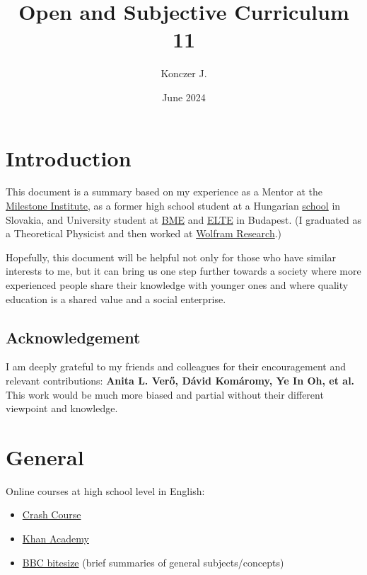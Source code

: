\documentclass{article}
\title{Open and Subjective Curriculum \\ 11}
\author{Konczer J.}
\date{June 2024}
\begin{document}
\maketitle

\section*{}

\section{Introduction}

This document is a summary based on my experience as a Mentor at the \href{https://milestone-institute.org/}{Milestone Institute}, as a former high school student at a Hungarian \href{http://selye.gartproject.com/}{school} in Slovakia, and University student at \href{https://www.bme.hu/?language=en}{BME} and \href{https://www.elte.hu/en/}{ELTE} in Budapest.
(I graduated as a Theoretical Physicist and then worked at \href{https://www.wolfram.com/}{Wolfram Research}.)

Hopefully, this document will be helpful not only for those who have similar interests to me, but it can bring us one step further towards a society where more experienced people share their knowledge with younger ones and where quality education is a shared value and a social enterprise.

\subsection{Acknowledgement}

I am deeply grateful to my friends and colleagues for their encouragement and relevant contributions:
{\bf
Anita L. Verő,
Dávid Komáromy,
Ye In Oh,
et al.
}
This work would be much more biased and partial without their different viewpoint and knowledge.

\section{General}

Online courses at high school level in English:
\begin{itemize}
\item \href{https://thecrashcourse.com/}{Crash Course}
\item \href{https://www.khanacademy.org/}{Khan Academy}
\item \href{https://www.bbc.co.uk/bitesize/levels/z98jmp3}{BBC bitesize} (brief summaries of general subjects/concepts)
\end{itemize}
\end{document}
